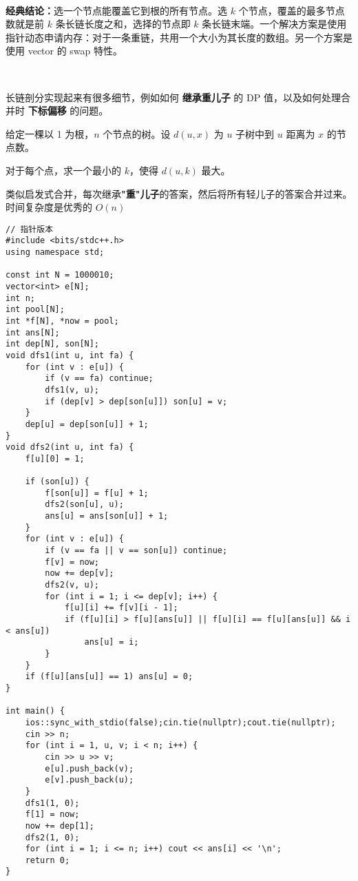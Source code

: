 ~\\
\par \noindent \textbf{经典结论：}选一个节点能覆盖它到根的所有节点。选 $k$ 个节点，覆盖的最多节点数就是前 $k$ 条长链长度之和，选择的节点即 $k$ 条长链末端。一个解决方案是使用指针动态申请内存：对于一条重链，共用一个大小为其长度的数组。另一个方案是使用 vector 的 swap 特性。

~\\

\par \noindent 长链剖分实现起来有很多细节，例如如何 \textbf{继承重儿子} 的 DP 值，以及如何处理合并时 \textbf{下标偏移} 的问题。

\begin{tcolorbox}
\par \noindent 给定一棵以 1 为根，$n$ 个节点的树。设 $d(u,x)$ 为 $u$ 子树中到 $u$ 距离为 $x$ 的节点数。

\par \noindent 对于每个点，求一个最小的 $k$，使得 $d(u,k)$ 最大。
\end{tcolorbox}

\par \noindent 类似启发式合并，每次继承\textbf{"重"儿子}的答案，然后将所有轻儿子的答案合并过来。时间复杂度是优秀的 $O(n)$

\begin{verbatim}
// 指针版本
#include <bits/stdc++.h>
using namespace std;

const int N = 1000010;
vector<int> e[N];
int n;
int pool[N];
int *f[N], *now = pool;
int ans[N];
int dep[N], son[N];
void dfs1(int u, int fa) {
    for (int v : e[u]) {
        if (v == fa) continue;
        dfs1(v, u);
        if (dep[v] > dep[son[u]]) son[u] = v;
    }
    dep[u] = dep[son[u]] + 1;
}
void dfs2(int u, int fa) {
    f[u][0] = 1;

    if (son[u]) {
        f[son[u]] = f[u] + 1;
        dfs2(son[u], u);
        ans[u] = ans[son[u]] + 1;
    }
    for (int v : e[u]) {
        if (v == fa || v == son[u]) continue;
        f[v] = now;
        now += dep[v];
        dfs2(v, u);
        for (int i = 1; i <= dep[v]; i++) {
            f[u][i] += f[v][i - 1];
            if (f[u][i] > f[u][ans[u]] || f[u][i] == f[u][ans[u]] && i < ans[u])
                ans[u] = i;
        }
    }
    if (f[u][ans[u]] == 1) ans[u] = 0;
}

int main() {
    ios::sync_with_stdio(false);cin.tie(nullptr);cout.tie(nullptr);
    cin >> n;
    for (int i = 1, u, v; i < n; i++) {
        cin >> u >> v;
        e[u].push_back(v);
        e[v].push_back(u);
    }
    dfs1(1, 0);
    f[1] = now;
    now += dep[1];
    dfs2(1, 0);
    for (int i = 1; i <= n; i++) cout << ans[i] << '\n';
    return 0;
}
\end{verbatim}

